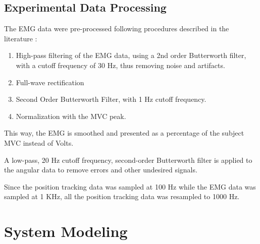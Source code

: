 \documentclass[letterpaper, 10 pt, conference]{ieeeconf}  %
\begin{document}
\subsection{Experimental Data Processing}

The EMG data were pre-processed following procedures described in the literature \cite{Rose20161112,Hayashibe20091621}:
\begin{enumerate}
\item High-pass filtering of the EMG data, using a 2nd order Butterworth filter, with a cutoff frequency of 30 Hz, thus removing noise and artifacts.
\item Full-wave rectification
\item Second Order Butterworth Filter, with 1 Hz cutoff frequency.
\item Normalization with the MVC peak.
\end{enumerate}

This way, the EMG is smoothed and presented as a percentage of the subject MVC instead of Volts.

A low-pass, 20 Hz cutoff frequency, second-order Butterworth filter is applied to the angular data to remove errors and other undesired signals.

Since the position tracking data was sampled at 100 Hz while the EMG data was sampled at 1 KHz, all the position tracking data was resampled to 1000 Hz.




\section{System Modeling}
\end{document}
